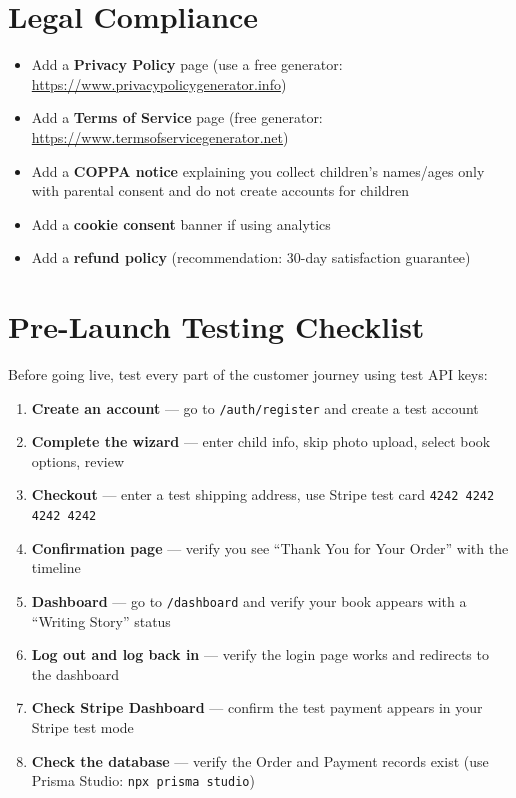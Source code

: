 \documentclass[12pt, letterpaper, oneside]{book}
\begin{document}
\section{Legal Compliance}

\begin{itemize}[leftmargin=2em, itemsep=4pt]
  \item[$\square$] Add a \textbf{Privacy Policy} page (use a free generator: \url{https://www.privacypolicygenerator.info})
  \item[$\square$] Add a \textbf{Terms of Service} page (free generator: \url{https://www.termsofservicegenerator.net})
  \item[$\square$] Add a \textbf{COPPA notice} explaining you collect children's names/ages only with parental consent and do not create accounts for children
  \item[$\square$] Add a \textbf{cookie consent} banner if using analytics
  \item[$\square$] Add a \textbf{refund policy} (recommendation: 30-day satisfaction guarantee)
\end{itemize}

\section{Pre-Launch Testing Checklist}

Before going live, test every part of the customer journey using test API keys:

\begin{enumerate}[leftmargin=2em, itemsep=4pt]
  \item \textbf{Create an account} --- go to \texttt{/auth/register} and create a test account
  \item \textbf{Complete the wizard} --- enter child info, skip photo upload, select book options, review
  \item \textbf{Checkout} --- enter a test shipping address, use Stripe test card \texttt{4242 4242 4242 4242}
  \item \textbf{Confirmation page} --- verify you see ``Thank You for Your Order'' with the timeline
  \item \textbf{Dashboard} --- go to \texttt{/dashboard} and verify your book appears with a ``Writing Story'' status
  \item \textbf{Log out and log back in} --- verify the login page works and redirects to the dashboard
  \item \textbf{Check Stripe Dashboard} --- confirm the test payment appears in your Stripe test mode
  \item \textbf{Check the database} --- verify the Order and Payment records exist (use Prisma Studio: \texttt{npx prisma studio})
\end{enumerate}
\end{document}
